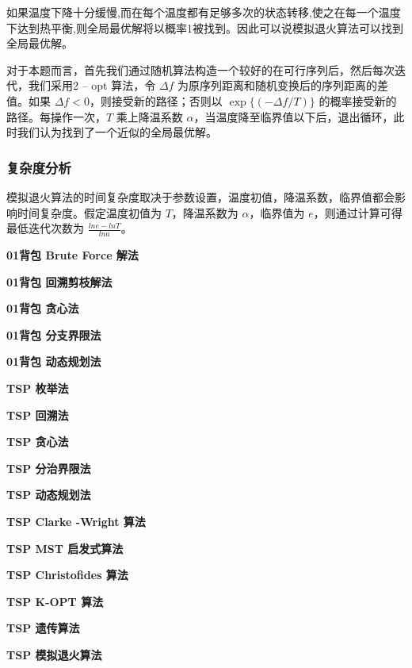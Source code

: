 \documentclass[lang=cn,11pt,a4paper]{elegantpaper}
\begin{document}
如果温度下降十分缓慢,而在每个温度都有足够多次的状态转移,使之在每一个温度下达到热平衡,则全局最优解将以概率1被找到。因此可以说模拟退火算法可以找到全局最优解。

对于本题而言，首先我们通过随机算法构造一个较好的在可行序列后，然后每次迭代，我们采用2 – opt 算法，令 $\Delta f$ 为原序列距离和随机变换后的序列距离的差值。如果 $\Delta f<0$，则接受新的路径；否则以 $\exp\{\left(-\Delta f/T\right)\}$ 的概率接受新的路径。每操作一次，$T$ 乘上降温系数 $\alpha$，当温度降至临界值以下后，退出循环，此时我们认为找到了一个近似的全局最优解。

\subsubsection{复杂度分析}
模拟退火算法的时间复杂度取决于参数设置，温度初值，降温系数，临界值都会影响时间复杂度。假定温度初值为 $T$，降温系数为 $\alpha$，临界值为 $e$，则通过计算可得最低迭代次数为 $\frac{ln{e}-ln{T}}{ln{a}}$。








\nocite{*}
\printbibliography[heading=bibintoc, title=\ebibname]

\appendix
\appendixpage
\addappheadtotoc


\textbf{01背包 Brute Force 解法}

\textbf{01背包 回溯剪枝解法}

\textbf{01背包 贪心法}

\textbf{01背包 分支界限法}

\textbf{01背包 动态规划法}


\textbf{TSP 枚举法}

\textbf{TSP 回溯法}

\textbf{TSP 贪心法}

\textbf{TSP 分治界限法}

\textbf{TSP 动态规划法}

\textbf{TSP Clarke -Wright 算法}

\textbf{TSP MST 启发式算法}

\textbf{TSP Christofides 算法}

\textbf{TSP K-OPT 算法}

\textbf{TSP 遗传算法}

\textbf{TSP 模拟退火算法}

\end{document}
